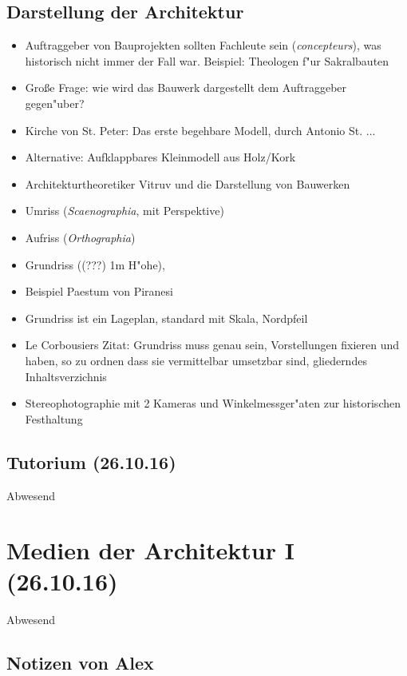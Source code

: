 \documentclass[]{scrartcl}
\begin{document}
\subsection{Darstellung der Architektur}

\begin{itemize}
    \item Auftraggeber von Bauprojekten sollten Fachleute sein (\emph{concepteurs}), was historisch nicht immer der Fall war. Beispiel: Theologen f"ur Sakralbauten
    \item Gro\ss e Frage: wie wird das Bauwerk dargestellt dem Auftraggeber gegen"uber?
    \item Kirche von St. Peter: Das erste begehbare Modell, durch Antonio St. ... 
    \item Alternative: Aufklappbares Kleinmodell aus Holz/Kork
    \item Architekturtheoretiker Vitruv und die Darstellung von Bauwerken
    \item Umriss (\emph{Scaenographia}, mit Perspektive)
    \item Aufriss (\emph{Orthographia})
    \item Grundriss ({\color{red}(???)} 1m H"ohe),
    \item Beispiel Paestum von Piranesi
    \item Grundriss ist ein Lageplan, standard mit Skala, Nordpfeil
    \item Le Corbousiers Zitat: Grundriss muss genau sein, Vorstellungen fixieren und haben, so zu ordnen dass sie vermittelbar umsetzbar sind, gliederndes Inhaltsverzichnis
    \item Stereophotographie mit 2 Kameras und Winkelmessger"aten zur historischen Festhaltung 
\end{itemize}

\subsection{Tutorium  (26.10.16)}
Abwesend

\section{Medien der Architektur I\\(26.10.16)}

Abwesend

\subsection{Notizen von Alex}
\end{document}
